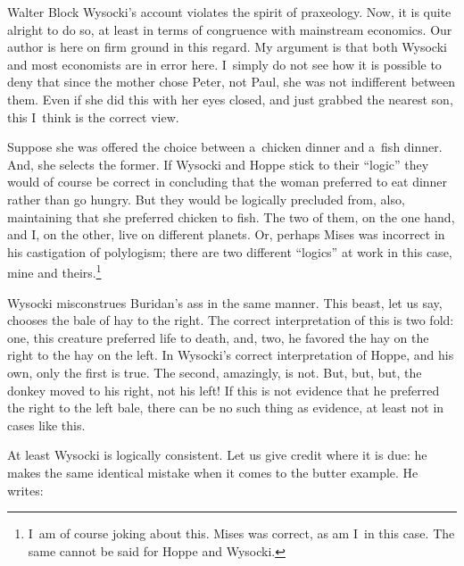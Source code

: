 \begin{artengenv}{Walter Block}
Wysocki's account violates the spirit of praxeology. Now, it is quite alright to do so, at least in terms of congruence with mainstream economics. Our author is here on firm ground in this regard. My argument is that both Wysocki and most economists are in error here. I~simply do not see how it is possible to deny that since the mother chose Peter, not Paul, she was not indifferent between them. Even if she did this with her eyes closed, and just grabbed the nearest son, this I~think is the correct view.

Suppose she was offered the choice between a~chicken dinner and a~fish dinner. And, she selects the former. If Wysocki and Hoppe stick to their ``logic'' they would of course be correct in concluding that the woman preferred to eat dinner rather than go hungry. But they would be logically precluded from, also, maintaining that she preferred chicken to fish. The two of them, on the one hand, and I, on the other, live on different planets. Or, perhaps Mises was incorrect in his castigation of polylogism; there are two different ``logics'' at work in this case, mine and theirs.\footnote{I~am of course joking about this. Mises was correct, as am I~in this case. The same cannot be said for Hoppe and Wysocki.}

Wysocki misconstrues Buridan's ass in the same manner. This beast, let us say, chooses the bale of hay to the right. The correct interpretation of this is two fold: one, this creature preferred life to death, and, two, he favored the hay on the right to the hay on the left. In Wysocki's correct interpretation of Hoppe, and his own, only the first is true. The second, amazingly, is not. But, but, but, the donkey moved to his right, not his left! If this is not evidence that he preferred the right to the left bale, there can be no such thing as evidence, at least not in cases like this.

At least Wysocki is logically consistent. Let us give credit where it is due: he makes the same identical mistake when it comes to the butter example. He writes:

\end{artengenv}
